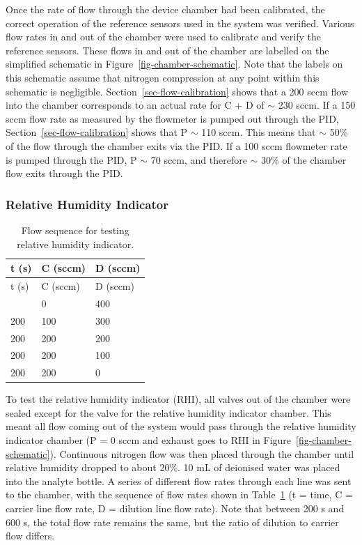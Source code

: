 \documentclass[
  a4paper,
]{scrbook}
\begin{document}
Once the rate of flow through the device chamber had been calibrated,
the correct operation of the reference sensors used in the system was
verified. Various flow rates in and out of the chamber were used to
calibrate and verify the reference sensors. These flows in and out of
the chamber are labelled on the simplified schematic in
Figure~\ref{fig-chamber-schematic}. Note that the labels on this
schematic assume that nitrogen compression at any point within this
schematic is negligible. Section~\ref{sec-flow-calibration} shows that a
200 sccm flow into the chamber corresponds to an actual rate for C + D
of \(\sim\) 230 sccm. If a 150 sccm flow rate as measured by the
flowmeter is pumped out through the PID,
Section~\ref{sec-flow-calibration} shows that P \(\sim\) 110 sccm. This
means that \(\sim\) 50\% of the flow through the chamber exits via the
PID. If a 100 sccm flowmeter rate is pumped through the PID, P \(\sim\)
70 sccm, and therefore \(\sim\) 30\% of the chamber flow exits through
the PID.

\hypertarget{relative-humidity-indicator}{%
\subsubsection*{Relative Humidity
Indicator}\label{relative-humidity-indicator}}

\hypertarget{tbl-RHI-flow-sequence}{}
\begin{longtable}[]{@{}lll@{}}
\caption{\label{tbl-RHI-flow-sequence}Flow sequence for testing relative
humidity indicator.}\tabularnewline
\toprule\noalign{}
t (s) & C (sccm) & D (sccm) \\
\midrule\noalign{}
\endfirsthead
\toprule\noalign{}
t (s) & C (sccm) & D (sccm) \\
\midrule\noalign{}
\endhead
\bottomrule\noalign{}
\endlastfoot
200 & 0 & 400 \\
200 & 100 & 300 \\
200 & 200 & 200 \\
200 & 200 & 100 \\
200 & 200 & 0 \\
\end{longtable}

To test the relative humidity indicator (RHI), all valves out of the
chamber were sealed except for the valve for the relative humidity
indicator chamber. This meant all flow coming out of the system would
pass through the relative humidity indicator chamber (P = 0 sccm and
exhaust goes to RHI in Figure~\ref{fig-chamber-schematic}). Continuous
nitrogen flow was then placed through the chamber until relative
humidity dropped to about 20\%. 10 mL of deionised water was placed into
the analyte bottle. A series of different flow rates through each line
was sent to the chamber, with the sequence of flow rates shown in
Table~\ref{tbl-RHI-flow-sequence} (t = time, C = carrier line flow rate,
D = dilution line flow rate). Note that between 200 s and 600 s, the
total flow rate remains the same, but the ratio of dilution to carrier
flow differs.
\end{document}
